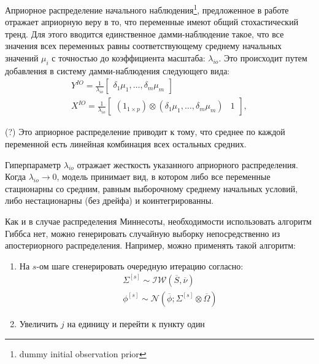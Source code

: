 \documentclass[11pt]{article} %
\newcommand{\cN}{\mathcal{N}}
\newcommand{\cIW}{\mathcal{IW}}
\newcommand{\post}{\overline}
\begin{document}
Априорное распределение начального наблюдения\footnote{dummy initial observation prior }, предложенное в работе \cite{sims_1993} отражает априорную веру в то, что переменные имеют общий стохастический тренд. Для этого вводится единственное дамми-наблюдение такое, что все значения всех переменных равны соответствующему среднему начальных значений $\mu_i$ с точностью до коэффициента масштаба: $\lambda_{io}$. Это происходит  путем добавления в систему дамми-наблюдения следующего вида:
\begin{gather}
Y^{IO}=\frac{1}{\lambda_{io}}\begin{bmatrix}
\delta_1\mu_1,\ldots,\delta_m\mu_m
\end{bmatrix}\\
X^{IO}=\frac{1}{\lambda_{io}}\begin{bmatrix}
(1_{1\times p})\otimes (\delta_1\mu_1,\ldots,\delta_m\mu_m) &1
\end{bmatrix},
\end{gather}

(?) Это априорное распределение приводит к тому, что среднее по каждой переменной есть линейная комбинация всех остальных средних.




Гиперпараметр $\lambda_{io}$ отражает жесткость указанного априорного распределения. Когда $\lambda_{io}\to 0 $,  модель принимает вид, в котором либо все переменные стационарны со средним, равным выборочному среднему начальных условий, либо нестационарны (без дрейфа) и коинтегрированны. 


Как и в случае распределения Миннесоты, необходимости использовать алгоритм Гиббса нет, можно генерировать случайную выборку непосредственно из апостериорного распределения. Например, можно применять такой алгоритм:


\begin{enumerate}
\item На $s$-ом шаге сгенерировать очередную итерацию согласно:
\begin{align*}
&\Sigma^{[s]} \sim \cIW(\post S, \post \nu) \\
&\phi^{[s]}\sim \cN(\post \phi; \Sigma^{[s]} \otimes \post \Omega)
\end{align*}
\item Увеличить $j$ на единицу и перейти к пункту один
\end{enumerate}
\end{document}
